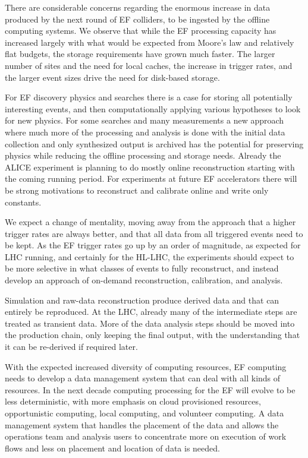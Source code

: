There are considerable concerns regarding the enormous increase  in data
produced by the next round of EF colliders,   to be ingested by the offline
computing systems.  We observe that while the EF processing capacity has
increased largely with what would be expected from Moore's law and relatively
flat budgets, the storage requirements have grown much faster.  The larger
number of sites and the need for local caches, the increase in trigger rates,
and the larger event sizes drive the need for disk-based storage.

For EF discovery physics and searches there is a case for storing all
potentially interesting events, and then computationally  applying various
hypotheses to look for new physics.  For some searches and many measurements a
new approach where much more of the processing and analysis is done with the
initial data collection and only synthesized output is archived has the
potential for preserving physics while reducing the offline processing and
storage needs.  Already the ALICE experiment is planning to do mostly online
reconstruction starting with  the coming running period.   For experiments at
future EF accelerators there will be strong motivations to reconstruct and
calibrate online and write only constants.

We expect a change of mentality, moving away from the approach  that a higher
trigger rates are always better, and that all data from  all triggered events
need to be kept.   As the EF trigger rates go up by an order of magnitude,  as
expected for LHC running, and certainly for the HL-LHC,  the experiments
should expect to be more selective in what classes of events to fully
reconstruct,  and instead develop an approach of on-demand reconstruction,
calibration, and analysis.

Simulation and raw-data reconstruction produce  derived data and that can
entirely be reproduced. At the LHC, already many of the intermediate steps are
treated as transient data.   More of the data analysis steps should be moved
into the production chain, only keeping the final output, with the
understanding that it can be re-derived if required later.

With the expected increased diversity of computing resources, EF computing
needs to develop a data management system that can deal with all kinds of
resources.   In the next decade computing processing for the EF will evolve to
be less deterministic, with more emphasis on cloud provisioned resources,
opportunistic computing, local computing, and volunteer computing.   A data
management system that handles the placement of the data and allows the
operations team and analysis users to concentrate more on execution of work
flows and less on placement and location of data is needed.

